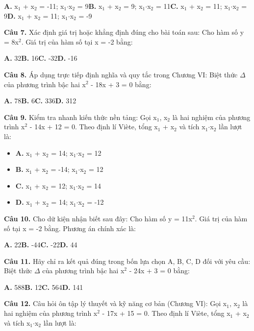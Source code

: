 \documentclass[11pt,a4paper]{article}
\begin{document}
\hspace*{1.5em}\textbf{A.} x$_1$ + x$_2$ = -11; x$_1$$\cdot$x$_2$ = 9\quad\quad \textbf{B.} x$_1$ + x$_2$ = 9; x$_1$$\cdot$x$_2$ = 11\quad\quad \textbf{C.} x$_1$ + x$_2$ = 11; x$_1$$\cdot$x$_2$ = 9\quad\quad \textbf{D.} x$_1$ + x$_2$ = 11; x$_1$$\cdot$x$_2$ = -9\par\vspace{2pt}
\textbf{\color{primary} Câu 7.} Xác định giá trị hoặc khẳng định đúng cho bài toán sau: Cho hàm số y = 8x$^2$. Giá trị của hàm số tại x = -2 bằng:\par
\hspace*{1.5em}\textbf{A.} 32\quad\quad \textbf{B.} 16\quad\quad \textbf{C.} -32\quad\quad \textbf{D.} -16\par\vspace{2pt}
\textbf{\color{primary} Câu 8.} Áp dụng trực tiếp định nghĩa và quy tắc trong Chương VI: Biệt thức $\Delta$ của phương trình bậc hai x$^2$ - 18x + 3 = 0 bằng:\par
\hspace*{1.5em}\textbf{A.} 78\quad\quad \textbf{B.} 6\quad\quad \textbf{C.} 336\quad\quad \textbf{D.} 312\par\vspace{2pt}
\textbf{\color{primary} Câu 9.} Kiểm tra nhanh kiến thức nền tảng: Gọi x$_1$, x$_2$ là hai nghiệm của phương trình x$^2$ - 14x + 12 = 0. Theo định lí Viète, tổng x$_1$ + x$_2$ và tích x$_1$$\cdot$x$_2$ lần lượt là:\par
\begin{itemize}\setlength{\itemsep}{1pt}\setlength{\parskip}{0pt}
  \item[] \textbf{A.} x$_1$ + x$_2$ = 14; x$_1$$\cdot$x$_2$ = 12
  \item[] \textbf{B.} x$_1$ + x$_2$ = -14; x$_1$$\cdot$x$_2$ = 12
  \item[] \textbf{C.} x$_1$ + x$_2$ = 12; x$_1$$\cdot$x$_2$ = 14
  \item[] \textbf{D.} x$_1$ + x$_2$ = 14; x$_1$$\cdot$x$_2$ = -12
\end{itemize}\vspace{2pt}
\textbf{\color{primary} Câu 10.} Cho dữ kiện nhận biết sau đây: Cho hàm số y = 11x$^2$. Giá trị của hàm số tại x = -2 bằng. Phương án chính xác là:\par
\hspace*{1.5em}\textbf{A.} 22\quad\quad \textbf{B.} -44\quad\quad \textbf{C.} -22\quad\quad \textbf{D.} 44\par\vspace{2pt}
\textbf{\color{primary} Câu 11.} Hãy chỉ ra kết quả đúng trong bốn lựa chọn A, B, C, D đối với yêu cầu: Biệt thức $\Delta$ của phương trình bậc hai x$^2$ - 24x + 3 = 0 bằng:\par
\hspace*{1.5em}\textbf{A.} 588\quad\quad \textbf{B.} 12\quad\quad \textbf{C.} 564\quad\quad \textbf{D.} 141\par\vspace{2pt}
\textbf{\color{primary} Câu 12.} Câu hỏi ôn tập lý thuyết và kỹ năng cơ bản (Chương VI): Gọi x$_1$, x$_2$ là hai nghiệm của phương trình x$^2$ - 17x + 15 = 0. Theo định lí Viète, tổng x$_1$ + x$_2$ và tích x$_1$$\cdot$x$_2$ lần lượt là:\par
\end{document}
